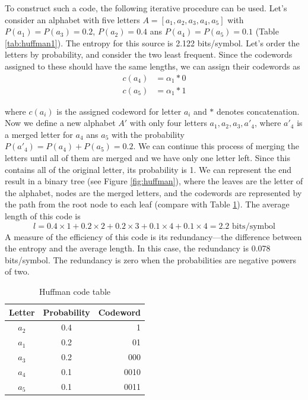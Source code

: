 \documentclass{diploma_style}
\begin{document}
To construct such a code, the following iterative procedure can be used. Let's consider an alphabet with five letters $A = [a_1,a_2,a_3,a_4,a_5]$ with $P(a_1)=P(a_3)=0.2$, $P(a_2)=0.4$ ans $P(a_4)=P(a_5)=0.1$ (Table \ref{tab:huffman1}). The entropy for this source is 2.122 bits/symbol. Let's order the letters by probability, and consider the two least frequent. Since the codewords assigned to these should have the same lengths, we can assign their codewords as
\begin{align*}
c(a_4) &= \alpha_1 * 0 \\
c(a_5) &= \alpha_1 *1
\end{align*}

where $c(a_i)$ is the assigned codeword for letter $a_i$ and $*$ denotes concatenation. Now we define a new alphabet $A'$ with only four letters $a_1, a_2, a_3, a'_4$, where $a'_4$ is a merged letter for $a_4$ ans $a_5$ with the probability $P(a'_4) = P(a_4) + P(a_5) = 0.2$. We can continue this process of merging the letters until all of them are merged and we have only one letter left. Since this contains all of the original letter, its probability is 1. We can represent the end result in a binary tree (see Figure \ref{fig:huffman}), where the leaves are the letter of the alphabet, nodes are the merged letters, and the codewords are represented by the path from the root node to each leaf (compare with Table \ref{tab:huffman2}). The average length of this code is
\begin{equation}
l = 0.4\times 1 + 0.2 \times 2 + 0.2 \times 3 + 0.1 \times 4 + 0.1 \times 4 = 2.2 \text{ bits/symbol}
\end{equation}
A measure of the efficiency of this code is its redundancy—the difference between the entropy
and the average length. In this case, the redundancy is 0.078 bits/symbol. The redundancy is
zero when the probabilities are negative powers of two.

\begin{table}
\caption{Huffman code table}
\centering
\begin{tabular}{ccr}
\toprule
Letter & Probability & Codeword \\
\midrule
$a_2$ & 0.4 & 1 \\
$a_1$ & 0.2 & 01 \\
$a_3$ & 0.2 & 000 \\
$a_4$ & 0.1 & 0010 \\
$a_5$ & 0.1 & 0011 \\
\bottomrule
\end{tabular}
\label{tab:huffman2}
\end{table}
\end{document}
